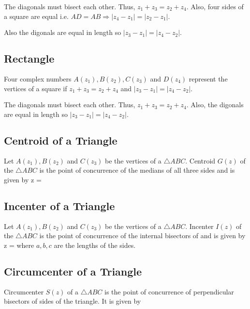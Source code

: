 \startplacefigure[title={Square}]
\stopplacefigure

The diagonals must bisect each other. Thus, $z_1 + z_3 = z_2 + z_4.$ Also, four sides of a square are equal i.e. $AD = AB
\Rightarrow |z_4 - z_1| = |z_2 - z_1|$.

Also the digonals are equal in length so $|z_3 - z_1| = |z_4 - z_2|$.

\subsection{Rectangle}
Four complex numbers $A(z_1), B(z_2), C(z_3)$ and $D(z_4)$ represent the vertices of a square if $z_1 + z_3 = z_2 + z_4$ and $|z_3
- z_1| = |z_4 - z_2|$.

\startplacefigure[title={Rectangle}]
\stopplacefigure

The diagonals must bisect each other. Thus, $z_1 + z_3 = z_2 + z_4$. Also, the digonals are equal in length so $|z_3 - z_1| = |z_4
- z_2|$.

\subsection{Centroid of a Triangle}
Let $A(z_1), B(z_2)$ and $C(z_3)$ be the vertices of a $\triangle ABC.$ Centroid $G(z)$ of the $\triangle ABC$ is the point of
concurrence of the medians of all three sides and is given by
\startformula z = \stopformula

\startplacefigure[title={Centroid of a triangle.}]
\stopplacefigure

\subsection{Incenter of a Triangle}
Let $A(z_1), B(z_2)$ and $C(z_3)$ be the vertices of a $\triangle ABC.$ Incenter $I(z)$ of the $\triangle ABC$ is the point of
concurrence of the internal bisectors of and is given by
\startformula z = \stopformula
where $a, b, c$ are the lengths of the sides.

\subsection{Circumcenter of a Triangle}
Circumcenter $S(z)$ of a $\triangle ABC$ is the point of concurrence of perpendicular bisectors of sides of the triangle. It is
given by

